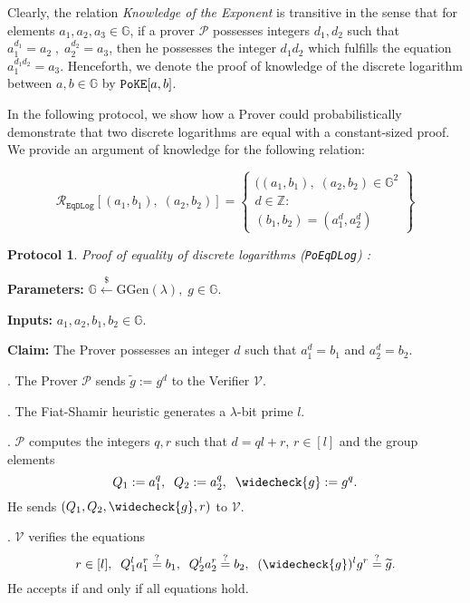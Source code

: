 \documentclass[11pt, lettersize, notitlepage, leqno, footskip=0.6cm]{article}
\newcommand{\ttt}{\texttt}
\newcommand{\wti}{\widetilde}
\newcommand{\mc}{\mathcal}
\newcommand{\mb}{\mathbb}
\newcommand{\mr}{\mathrm}
\newcommand{\lamb}{\lambda}
\newcommand{\weck}{\widecheck}
\newcommand{\mP}{\mc{P}}
\newcommand{\vs}{\vspace{-0.15cm}}
\newcommand{\noin}{\noindent}
\newcommand{\sta}{\stackrel{?}{=}}
\newtheorem{Prot}[Thm]{Protocol}
\numberwithin{equation}{section}
\begin{document}
Clearly, the relation \textit{Knowledge of the Exponent} is transitive in the sense that for elements $a_1,a_2,a_3\in\mb{G}$, if a prover $\mP$ possesses integers $d_1,d_2$ such that $a_1^{d_1} = a_2\;,\;a_2^{d_2} = a_3$, then he possesses the integer $d_1d_2$ which fulfills the equation $a_1^{d_1d_2} = a_3$. Henceforth, we denote the proof of knowledge of the discrete logarithm between $a,b\in\mb{G}$ by $\verb|PoKE|[a,b]$. 

In the following protocol, we show how a Prover could probabilistically demonstrate that two discrete logarithms are equal with a constant-sized proof. We provide an argument of knowledge for  the following relation:

\[
  \mc{R}_{\ttt{EqDLog}}[(a_1, b_1),\;(a_2,b_2)] = \left\{\begin{array}{l}
    ((a_1, b_1),\; (a_2,b_2)\in\mb{G}^2\\
    d\in\mb{Z}: \\
    (b_1,b_2) = (a_1^d,a_2^d)
  \end{array}\right\}
\]
\vspace{0.15cm}


\begin{Prot}\label{EqDLog} \normalfont \textit{Proof of equality of discrete logarithms} (\verb|PoEqDLog|) :\end{Prot} \vspace{-0.3cm}

\noindent \textbf{Parameters:} $\mb{G}\xleftarrow{\$} \mr{GGen}(\lamb), \; g\in \mb{G}$.

\noindent \textbf{Inputs:} $a_1, a_2, b_1, b_2 \in \mb{G}$.

\noindent \textbf{Claim:} The Prover possesses an integer $d$ such that $a_1^d = b_1$ and $a_2^d = b_2$.

\begin{prf1}\normalfont \noin 1. The Prover $\mc{P}$ sends $\wti{g}:= g^d$ to the Verifier $\mc{V}$.

. The Fiat-Shamir heuristic generates a $\lamb$-bit prime $l$. 

. $\mc{P}$ computes the integers $q, r$ such that $d = ql+r$, $r\in [l]$ and the group elements \vs $$Q_1:= a_1^q,\;\; Q_2:= a_2^q,\;\; \weck{g}:= g^q.$$ He sends $(Q_1, Q_2, \weck{g}, r)$ to $\mc{V}$.

. $\mc{V}$ verifies the equations \vs $$r\in [l],\;\;Q_1^la_1^r \sta  b_1, \;\; Q_2^la_2^r \sta  b_2, \;\; (\weck{g})^lg^r \sta \wti{g}.$$ He accepts if and only if all equations hold.\end{prf1}
\end{document}
